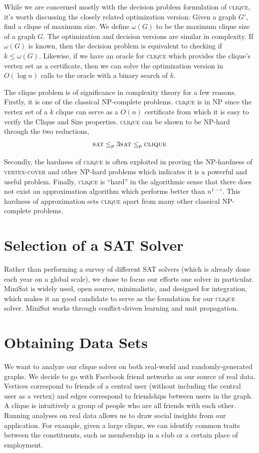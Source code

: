 \documentclass[]{article}
\newcommand{\clique}{\textsc{clique}}
\begin{document}
	While we are concerned mostly with the decision problem formulation of \clique{}, it's worth discussing the closely related optimization version: Given a graph $G'$, find a clique of maximum size. We define $\omega(G)$ to be the maximum clique size of a graph $G$. The optimization and decision versions are similar in complexity. If $\omega(G)$ is known, then the decision problem is equivalent to checking if $k \le \omega(G)$. Likewise, if we have an oracle for \clique{} which provides the clique's vertex set as a certificate, then we can solve the optimization version in $O(\log n)$ calls to the oracle with a binary search of $k$.
	
	The clique problem is of significance in complexity theory for a few reasons. Firstly, it is one of the classical NP-complete problems. \clique{} is in NP since the vertex set of a $k$ clique can serve as a $O(n)$ certificate from which it is easy to verify the Clique and Size properties. \clique{} can be shown to be NP-hard through the two reductions,
	\begin{align}
	\textsc{sat} \le_p \textsc{3sat} \le_p \clique
	\end{align}
	
	Secondly, the hardness of \clique{} is often exploited in proving the NP-hardness of \textsc{vertex-cover} and other NP-hard problems which indicates it is a powerful and useful problem. Finally, \clique{} is ``hard'' in the algorithmic sense that there does not exist an approximation algorithm which performs better than $n^{1 - \epsilon}$\cite{Hastad1999}. This hardness of approximation sets \clique{} apart from many other classical NP-complete problems.
	
	\section{Selection of a SAT Solver}
	Rather than performing a survey of different SAT solvers (which is already done each year on a global scale), we chose to focus our efforts one solver in particular. MiniSat is widely used, open source, minimalistic, and designed for integration, which makes it an good candidate to serve as the foundation for our \clique{} solver. MiniSat works through conflict-driven learning and unit propagation\cite{Een03anextensible}.
	
	\section{Obtaining Data Sets}
	We want to analyze our clique solver on both real-world and randomly-generated graphs. We decide to go with Facebook friend networks as our source of real data. Vertices correspond to friends of a central user (without including the central user as a vertex) and edges correspond to friendships between users in the graph. A clique is intuitively a group of people who are all friends with each other. Running analyses on real data allows us to draw social insights from our application. For example, given a large clique, we can identify common traits between the constituents, such as membership in a club or a certain place of employment.
	
\end{document}
